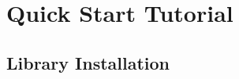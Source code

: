 %
%
% 
% 
% 
% 
% 

%
%

\chapter{Quick Start Tutorial}
\label{sec:quickstart}

\section{Library Installation}

